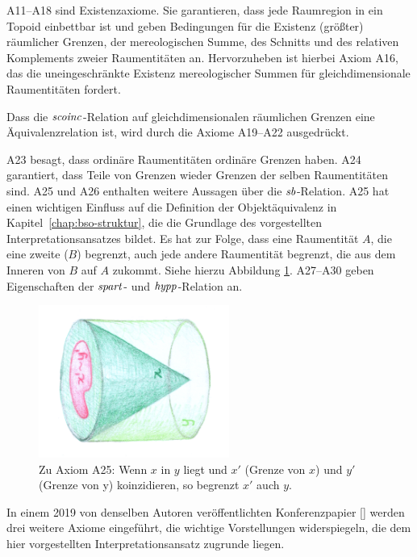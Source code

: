 A11--A18
sind Existenzaxiome. 
Sie garantieren, dass jede Raumregion in ein Topoid einbettbar ist und geben Bedingungen für die Existenz (größter) räumlicher Grenzen, der mereologischen Summe, des Schnitts und des relativen Komplements zweier Raumentitäten an.
Hervorzuheben ist hierbei Axiom A16, das die uneingeschränkte Existenz mereologischer Summen für gleichdimensionale Raumentitäten fordert.

Dass
die $\mathit{scoinc}$-Relation auf gleichdimensionalen räumlichen Grenzen eine Äquivalenzrelation ist, wird durch die Axiome A19--A22 ausgedrückt.

A23
besagt, dass ordinäre Raumentitäten ordinäre Grenzen haben.
A24 garantiert, dass Teile von Grenzen wieder Grenzen der selben Raumentitäten sind.
A25 und A26 enthalten weitere Aussagen über die $\mathit{sb}$-Relation.
A25 hat einen wichtigen Einfluss auf die Definition der Objektäquivalenz in Kapitel~\ref{chap:bso-struktur}, die die Grundlage des vorgestellten Interpretationsansatzes bildet.
Es hat zur Folge, dass eine Raumentität $A$, die eine zweite ($B$) begrenzt, auch jede andere Raumentität begrenzt, die \glqq aus dem Inneren von $B$ auf $A$ zukommt\grqq .
Siehe hierzu Abbildung \ref{fig:A25}.
A27--A30
geben Eigenschaften der $\mathit{spart}$- und $\mathit{hypp}$-Relation an.


    \begin{figure}[ht]
        \centering
        \includegraphics[height=5cm]{bearbeitet-22-04-25/a25.png}
        \caption[Zu Axiom 25]{Zu Axiom A25: Wenn $x$ in $y$ liegt und $x'$ (Grenze von $x$) und $y'$ (Grenze von y) koinzidieren, so begrenzt $x'$ auch $y$.}
        \label{fig:A25}
    \end{figure}
    
    In
    einem 2019 von denselben Autoren veröffentlichten Konferenzpapier [\cite{baumann-r-2019--a}] werden drei weitere Axiome eingeführt, die wichtige Vorstellungen widerspiegeln, die dem hier vorgestellten Interpretationsansatz zugrunde liegen.
    
